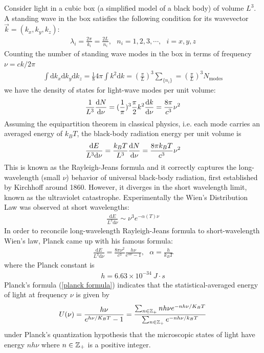 Consider light in a cubic box (a simplified model of a black body) of volume $L^3$. A standing wave in the box satisfies the following condition for its wavevector $\vec k=(k_x,k_y,k_z)$:
\begin{align}
  \lambda_i=\frac{2\pi}{k_i}=\frac{2L}{n_i},~~~n_i=1,2,3,\cdots,~~~i=x,y,z  
\end{align}
Counting the number of standing wave modes in the box in terms of frequency $\nu=ck/2\pi$
\begin{align}
\int\text{d}k_x\text{d}k_y\text{d}k_z=\frac184\pi\int k^2\text{d}k=(\frac{\pi}{L})^3\sum_{\{n_i\}}=(\frac{\pi}{L})^3N_\text{modes}
\end{align}
we have the density of states for light-wave modes per unit volume:
\begin{align}
\frac{1}{L^3}\frac{\text{d}N}{\text{d}\nu}=(\frac{1}{\pi})^3\frac\pi2 k^2\frac{\mathrm{d} k}{\mathrm{d}\nu}=\frac{8\pi}{c^3}\nu^2
\end{align}
Assuming the equipartition theorem in classical physics, i.e. each mode carries an averaged energy of $k_BT$, the black-body radiation energy per unit volume is
\begin{align}
\frac{\mathrm{d} E}{L^3\mathrm{d}\nu}=\frac{k_BT}{L^3}\frac{\text{d}N}{\text{d}\nu}=\frac{8\pi k_BT}{c^3}\nu^2
\end{align}
This is known as the Rayleigh-Jeans formula and it correctly captures the long-wavelength (small $\nu$) behavior of universal black-body radiation, first established by Kirchhoff around 1860. However, it diverges in the short wavelength limit, known as the ultraviolet catastrophe. Experimentally the Wien's Distribution Law was observed at short wavelengths:
\begin{align}
\frac{\text{d}E}{L^3\text{d}\nu}\sim\nu^3e^{-\alpha(T)\nu}
\end{align}
In order to reconcile long-wavelength Rayleigh-Jeans formula to short-wavelength Wien's law, Planck came up with his famous formula:
\begin{align}\label{planck formula}
\frac{\text{d}E}{L^3\text{d}\nu}=\frac{8\pi\nu^2}{c^3}\frac{h\nu}{e^{\alpha\nu}-1},~~~\alpha=\frac{h}{k_BT}
\end{align}
where the Planck constant is 
\begin{align}
h=6.63\times10^{-34}~J\cdot s
\end{align}
Planck's formula (\ref{planck formula}) indicates that the statistical-averaged energy of light at frequency $\nu$ is given by
\begin{align}
U(\nu)=\frac{h\nu}{e^{h\nu/K_BT}-1}=\frac{\sum_{n\in{\mathbb{Z}}_+}nh\nu e^{-nh\nu/K_BT}}{\sum_{n\in{\mathbb{Z}}_+}e^{-nh\nu/k_BT}}
\end{align}
under Planck's quantization hypothesis that the microscopic states of light have energy $nh\nu$ where $n\in{\mathbb{Z}}_+$ is a positive integer. 

